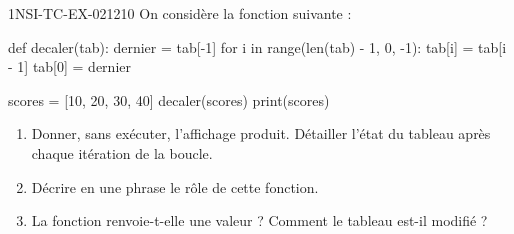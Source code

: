 \begin{exercice}{1NSI-TC-EX-021}{2}{10}
On considère la fonction suivante :
\begin{python}
def decaler(tab):
    dernier = tab[-1]
    for i in range(len(tab) - 1, 0, -1):
        tab[i] = tab[i - 1]
    tab[0] = dernier

scores = [10, 20, 30, 40]
decaler(scores)
print(scores)
\end{python}
\begin{enumerate}
  \item Donner, sans exécuter, l'affichage produit. Détailler l'état du tableau
        après chaque itération de la boucle.
  \item Décrire en une phrase le rôle de cette fonction.
  \item La fonction renvoie-t-elle une valeur ? Comment le tableau est-il modifié ?
\end{enumerate}
\end{exercice}
